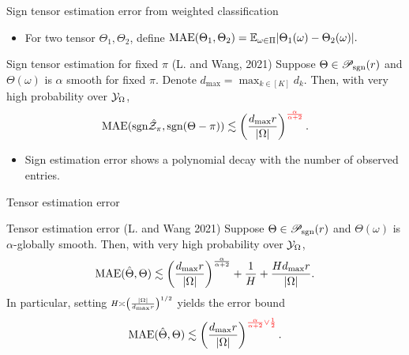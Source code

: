 \documentclass[10pt, mathserif]{beamer} %
\theoremstyle{definition}
\theoremstyle{plain}
\def\caliP{\mathscr{P}_{\textup{sgn}}}
\begin{document}
\begin{frame}{Sign tensor estimation error from weighted classification}
\begin{itemize}
\item For two tensor $\Theta_1,\Theta_2$, define $\textup{MAE}(\Theta_1,\Theta_2) = \mathbb{E}_{\omega\in\Pi}|\Theta_1(\omega)-\Theta_2(\omega)|.$
\end{itemize}
    \begin{block}{Sign tensor estimation for fixed $\pi$ (L. and Wang, 2021)}
    Suppose $\Theta\in\caliP(r)$ and  $\Theta(\omega)$ is $\alpha$ smooth for fixed $\pi$.  Denote $d_{\max}=\max_{k\in[K]} d_k$. Then, with very high probability over $\mathcal{Y}_\Omega$, 
\begin{align}
\textup{MAE}(\text{sgn}\hat {\mathcal{Z}}_\pi, \text{sgn}(\Theta-\pi)) \lesssim  \left({d_{\max} r\over |\Omega|}\right)^{\color{red}\alpha\over \alpha+2}.
\end{align}
    \end{block}
    \begin{itemize}
    \item Sign estimation error shows a polynomial decay with the number of observed entries.
    \end{itemize}
\end{frame}

\begin{frame}{Tensor estimation  error}
    \begin{block}{Tensor estimation error (L. and Wang 2021)}
    Suppose $\Theta\in\caliP(r)$ and  $\Theta(\omega)$ is $\alpha$-globally smooth. Then, with very high probability over $\mathcal{Y}_\Omega$, 
    \begin{equation}\label{eq:bound2}
\textup{MAE}(\hat \Theta, \Theta)\lesssim \left({d_{\max} r \over |\Omega|}\right)^{\alpha\over\alpha+2}+{1\over H}+{Hd_{\max} r \over |\Omega|}.
\end{equation}
In particular, setting $\scriptstyle H\asymp \left( |\Omega|\over d_{\max}r\right)^{1/2}$ yields the error bound
\begin{equation}\label{eq:real}
\textup{MAE}(\hat \Theta, \Theta)\lesssim \left(d_{\max}r \over |\Omega|\right)^{\color{red}{\alpha \over \alpha+2} \vee {1\over 2}}.
\end{equation}
    \end{block}
\end{frame}
\end{document}
